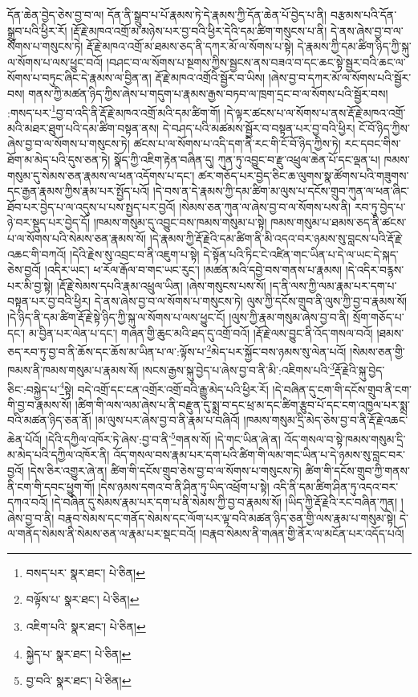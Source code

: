 དོན་ཆེན་བྱེད་ཅེས་བྱ་བ་ལ། དོན་ནི་སྒྲུབ་པ་པོ་རྣམས་ཏེ་དེ་རྣམས་ཀྱི་དོན་ཆེན་པོ་བྱེད་པ་ནི། བརྩམས་པའི་དོན་སྒྲུབ་པའི་ཕྱིར་རོ། །རྡོ་རྗེ་མཁའ་འགྲོ་མ་མཉེས་པར་བྱ་བའི་ཕྱིར་དེའི་དམ་ཚིག་གསུངས་པ་ནི། དེ་ནས་ཞེས་བྱ་བ་ལ་སོགས་པ་གསུངས་ཏེ། རྡོ་རྗེ་མཁའ་འགྲོ་མ་ཐམས་ཅད་ནི་དཀར་མོ་ལ་སོགས་པ་སྟེ། དེ་རྣམས་ཀྱི་དམ་ཚིག་ཉིད་ཀྱི་སྐུ་ལ་སོགས་པ་ལས་ཕྱུང་བའོ། །བཤང་བ་ལ་སོགས་པ་སྔགས་ཀྱིས་སྦྱངས་ནས་བཟའ་བ་དང་ཆང་སྟེ་སྦྱར་བའི་ཆང་ལ་སོགས་པ་བཏུང་ཞིང་དེ་རྣམས་ལ་བྱིན་ན། རྡོ་རྗེ་མཁའ་འགྲོའི་སྦྱོར་བ་ཡིས། །ཞེས་བྱ་བ་དཀར་མོ་ལ་སོགས་པའི་སྦྱོར་བས། གནས་ཀྱི་མཚན་ཉིད་ཀྱིས་ཞེས་པ་གདུག་པ་རྣམས་རྒྱས་བཏབ་ལ་ཁྲག་དྲང་བ་ལ་སོགས་པའི་སྦྱོར་བས། :གསད་པར་\footnote{བསད་པར་  སྣར་ཐང་།  པེ་ཅིན། }བྱ་བ་འདི་ནི་རྡོ་རྗེ་མཁའ་འགྲོ་མའི་དམ་ཚིག་གོ། །དེ་ལྟར་ཚངས་པ་ལ་སོགས་པ་ནས་རྡོ་རྗེ་མཁའ་འགྲོ་མའི་མཐར་ཐུག་པའི་དམ་ཚིག་བསྟན་ནས། དེ་བཤད་པའི་མཚམས་སྦྱོར་བ་བསྟན་པར་བྱ་བའི་ཕྱིར། ངོ་བོ་ཉིད་ཀྱིས་ཞེས་བྱ་བ་ལ་སོགས་པ་གསུངས་ཏེ། ཚངས་པ་ལ་སོགས་པ་འདི་དག་ནི་རང་གི་ངོ་བོ་ཉིད་ཀྱིས་ཏེ། རང་དབང་གིས་ཐོག་མ་མེད་པའི་དུས་ཅན་ཏེ། སྣོད་ཀྱི་འཇིག་རྟེན་བཞིན་དུ། ཀུན་ཏུ་འབྱུང་བ་རྫུ་འཕྲུལ་ཆེན་པོ་དང་ལྡན་པ། ཁམས་གསུམ་དུ་སེམས་ཅན་རྣམས་ལ་ཕན་འདོགས་པ་དང་། ཚར་གཅོད་པར་བྱེད་ཅིང་ཆ་ལུགས་སྣ་ཚོགས་པའི་གཟུགས་དང་རྒྱན་རྣམས་ཀྱིས་རྣམ་པར་སྤྱོད་པའོ། །དེ་བས་ན་དེ་རྣམས་ཀྱི་དམ་ཚིག་མ་ལུས་པ་དངོས་གྲུབ་ཀུན་ལ་ཕན་ཞིང་ཐོབ་པར་བྱེད་པ་ལ་འདུས་པ་པས་སྤྱད་པར་བྱའོ། །སེམས་ཅན་ཀུན་ལ་ཞེས་བྱ་བ་ལ་སོགས་པས་ནི། རབ་ཏུ་བྱེད་པ་ཉེ་བར་སྡུད་པར་བྱེད་དོ། །ཁམས་གསུམ་དུ་འབྱུང་བས་ཁམས་གསུམ་པ་སྟེ། ཁམས་གསུམ་པ་ཐམས་ཅད་ནི་ཚངས་པ་ལ་སོགས་པའི་སེམས་ཅན་རྣམས་སོ། །དེ་རྣམས་ཀྱི་རྡོ་རྗེའི་དམ་ཚིག་ནི་མི་འདའ་བར་ཉམས་སུ་བླངས་པའི་རྡོ་རྗེ་འཆང་གི་བཀའོ། །དེའི་རྗེས་སུ་འབྲང་བ་ནི་འཇུག་པ་སྟེ། དེ་སྟོན་པའི་ཏིང་ངེ་འཛིན་གང་ཡིན་པ་དེ་ལ་ཡང་དེ་སྐད་ཅེས་བྱའོ། །འདིར་ཡང་། ཕ་རོལ་རྒོལ་བ་གང་ཡང་རུང་། །མཚན་མའི་དབྱེ་བས་གནས་པ་རྣམས། །དེ་འདིར་བརྙས་པར་མི་བྱ་སྟེ། །རྡོ་རྗེ་སེམས་དཔའི་རྣམ་འཕྲུལ་ཡིན། །ཞེས་གསུངས་པས་སོ། །ད་ནི་ལས་ཀྱི་ལམ་རྣམ་པར་དག་པ་བསྟན་པར་བྱ་བའི་ཕྱིར། དེ་ནས་ཞེས་བྱ་བ་ལ་སོགས་པ་གསུངས་ཏེ། ལུས་ཀྱི་དངོས་གྲུབ་ནི་ལུས་ཀྱི་བྱ་བ་རྣམས་སོ། །དེ་ཉིད་ནི་དམ་ཚིག་རྡོ་རྗེ་སྟེ་ཉིད་ཀྱི་སྐུ་ལ་སོགས་པ་ལས་ཕྱུང་ངོ། །ལུས་ཀྱི་རྣམ་གསུམ་ཞེས་བྱ་བ་ནི། སྲོག་གཅོད་པ་དང་། མ་བྱིན་པར་ལེན་པ་དང་། གཞན་གྱི་ཆུང་མའི་ཐད་དུ་འགྲོ་བའོ། །རྡོ་རྗེ་ལས་བྱུང་ནི་འོད་གསལ་བའོ། །ཐམས་ཅད་རབ་ཏུ་བྱ་བ་ནི་ཆོས་དང་ཆོས་མ་ཡིན་པ་ལ་:ལྟོས་པ་\footnote{བལྟོས་པ་  སྣར་ཐང་།  པེ་ཅིན། }མེད་པར་སྐྱོང་བས་ཉམས་སུ་ལེན་པའོ། །སེམས་ཅན་གྱི་ཁམས་ནི་ཁམས་གསུམ་པ་རྣམས་སོ། །སངས་རྒྱས་སྐུ་བྱེད་པ་ཞེས་བྱ་བ་ནི་མི་:འཇིགས་པའི་\footnote{འཇིག་པའི་  སྣར་ཐང་།  པེ་ཅིན། }རྡོ་རྗེའི་སྐུ་བྱེད་ཅིང་:བསྐྱེད་པ་\footnote{སྐྱེད་པ་  སྣར་ཐང་།  པེ་ཅིན། }སྟེ། བདེ་འགྲོ་དང་ངན་འགྲོར་འགྲོ་བའི་རྒྱུ་མེད་པའི་ཕྱིར་རོ། །དེ་བཞིན་དུ་ངག་གི་དངོས་གྲུབ་ནི་ངག་གི་བྱ་བ་རྣམས་སོ། །ཚིག་གི་ལས་ལམ་ཞེས་པ་ནི་བརྫུན་དུ་སྨྲ་བ་དང་ཕྲ་མ་དང་ཚིག་རྩུབ་པོ་དང་ངག་འཁྱལ་པར་སྨྲ་བའི་མཚན་ཉིད་ཅན་ནོ། །མ་ལུས་པར་ཞེས་བྱ་བ་ནི་རྣམ་པ་བཞིའོ། །ཁམས་གསུམ་དྲི་མེད་ཅེས་བྱ་བ་ནི་རྡོ་རྗེ་འཆང་ཆེན་པོའོ། །དེའི་དཀྱིལ་འཁོར་ཏེ་ཞེས་:བྱ་བ་ནི་\footnote{བྱ་བའི་  སྣར་ཐང་།  པེ་ཅིན། }གནས་སོ། །དེ་གང་ཡིན་ཞེ་ན། འོད་གསལ་བ་སྟེ་ཁམས་གསུམ་དྲི་མ་མེད་པའི་དཀྱིལ་འཁོར་ནི། འོད་གསལ་བས་རྣམ་པར་དག་པའི་ཚིག་གི་ལམ་གང་ཡིན་པ་དེ་ཉམས་སུ་བླང་བར་བྱའོ། །དེས་ཅིར་འགྱུར་ཞེ་ན། ཚིག་གི་དངོས་གྲུབ་ཅེས་བྱ་བ་ལ་སོགས་པ་གསུངས་ཏེ། ཚིག་གི་དངོས་གྲུབ་ཀྱི་གནས་ནི་ངག་གི་དབང་ཕྱུག་གོ། །དེས་ཉམས་དགའ་བ་ནི་ཤིན་ཏུ་ཡིད་འཕྲོག་པ་སྟེ། འདི་ནི་དམ་ཚིག་ཤིན་ཏུ་འདའ་བར་དཀའ་བའོ། །དེ་བཞིན་དུ་སེམས་རྣམ་པར་དག་པ་ནི་སེམས་ཀྱི་བྱ་བ་རྣམས་སོ། །ཡིད་ཀྱི་རྡོ་རྗེའི་རང་བཞིན་ཀུན། །ཞེས་བྱ་བ་ནི། བརྣབ་སེམས་དང་གནོད་སེམས་དང་ལོག་པར་ལྟ་བའི་མཚན་ཉིད་ཅན་གྱི་ལས་རྣམ་པ་གསུམ་སྟེ། དེ་ལ་གནོད་སེམས་ནི་སེམས་ཅན་ལ་རྣམ་པར་སྡང་བའོ། །བརྣབ་སེམས་ནི་གཞན་གྱི་ནོར་ལ་མངོན་པར་འདོད་པའོ། 